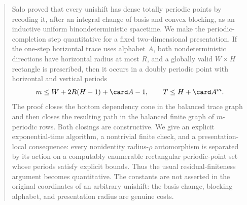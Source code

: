 \begin{abstract}
Salo proved that every unishift has dense totally periodic points by recoding it, after an integral change of basis and convex blocking, as an inductive uniform binondeterministic spacetime.  We make the periodic-completion step quantitative for a fixed two-dimensional presentation.  If the one-step horizontal trace uses alphabet $A$, both nondeterministic directions have horizontal radius at most $R$, and a globally valid $W\times H$ rectangle is prescribed, then it occurs in a doubly periodic point with horizontal and vertical periods
\[
 m\leq W+2R(H-1)+\card A-1,
 \qquad
 T\leq H+\card A^m.
\]
The proof closes the bottom dependency cone in the balanced trace graph and then closes the resulting path in the balanced finite graph of $m$-periodic rows.  Both closings are constructive.  We give an explicit exponential-time algorithm, a nontrivial finite check, and a presentation-local consequence: every nonidentity radius-$\rho$ automorphism is separated by its action on a computably enumerable rectangular periodic-point set whose periods satisfy explicit bounds.  Thus the usual residual-finiteness argument becomes quantitative.  The constants are not asserted in the original coordinates of an arbitrary unishift: the basis change, blocking alphabet, and presentation radius are genuine costs.
\end{abstract}
